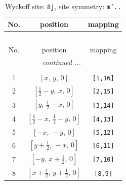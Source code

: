 \documentclass[fleqn,8pt]{jsarticle}
\begin{document}
\begin{longtable}{ccc}
\caption{Wyckoff site: {\tt 8j}, site symmetry: {\tt m'..}}
 \\
 \hline \hline
No. & position & mapping \\ \hline \endfirsthead

\multicolumn{2}{l}{\tablename\ \thetable{}} \\
 \hline \hline
No. & position & mapping \\ \hline \endhead

 \hline \hline
\multicolumn{2}{r}{\footnotesize\it continued ...} \\ \endfoot

 \hline \hline
\multicolumn{2}{r}{} \\ \endlastfoot

1 & $\left[ x,\, y,\, 0 \right]$ & {\tt [1,16]} \\ \hline
2 & $\left[ \frac{1}{2} - y,\, x,\, 0 \right]$ & {\tt [2,15]} \\ \hline
3 & $\left[ y,\, \frac{1}{2} - x,\, 0 \right]$ & {\tt [3,14]} \\ \hline
4 & $\left[ \frac{1}{2} - x,\, \frac{1}{2} - y,\, 0 \right]$ & {\tt [4,13]} \\ \hline
5 & $\left[ - x,\, - y,\, 0 \right]$ & {\tt [5,12]} \\ \hline
6 & $\left[ y + \frac{1}{2},\, - x,\, 0 \right]$ & {\tt [6,11]} \\ \hline
7 & $\left[ - y,\, x + \frac{1}{2},\, 0 \right]$ & {\tt [7,10]} \\ \hline
8 & $\left[ x + \frac{1}{2},\, y + \frac{1}{2},\, 0 \right]$ & {\tt [8,9]} \\
\end{longtable}
\renewcommand{\arraystretch}{1.2}
\end{document}
